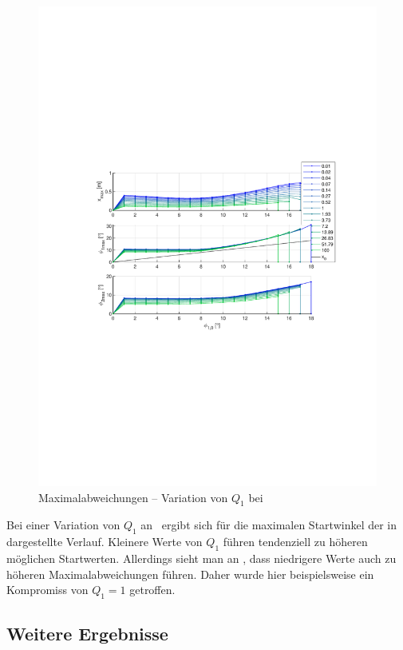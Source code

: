 \begin{figure}[htb]
	\centering
		\includegraphics[width=1.1\textwidth]{Bilder/QRVariation/ap4/q1 phi1 m.pdf}
	\caption{Maximalabweichungen -- Variation von $Q_1$ bei \apv}
	\label{fig:qrap4q1m}
\end{figure}

Bei einer Variation von $Q_1$ an \apv\ ergibt sich für die maximalen Startwinkel der in  dargestellte Verlauf.
Kleinere Werte von $Q_1$ führen tendenziell zu höheren möglichen Startwerten.
Allerdings sieht man an , dass niedrigere Werte auch zu höheren Maximalabweichungen führen.
Daher wurde hier beispielsweise ein Kompromiss von $Q_1=1$ getroffen.


\subsection{Weitere Ergebnisse}

